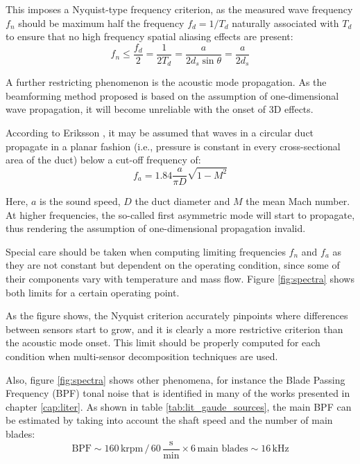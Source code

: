 This imposes a Nyquist-type frequency criterion, as the measured wave frequency $f_n$ should be maximum half the frequency $f_d=1/T_d$ naturally associated with $T_d$ to ensure that no high frequency spatial aliasing effects are present:
\begin{equation}\label{eq:f_nyquist}
  f_n \leq \frac{f_d}{2} = \frac{1}{2T_d}=\frac{a}{2d_s \sin \theta}=\frac{a}{2d_s}
\end{equation}

A further restricting phenomenon is the acoustic mode propagation. As the beamforming method proposed is based on the assumption of one-dimensional wave propagation, it will become unreliable with the onset of 3D effects.

According to Eriksson \cite{eriksson1980higher}, it may be assumed that waves in a circular duct propagate in a planar fashion (i.e., pressure is constant in every cross-sectional area of the duct) below a cut-off frequency of:
\begin{equation}\label{eq:f_modes}
f_a = 1.84 \frac{a}{\pi D}\sqrt{1-M^2}
\end{equation}

Here, $a$ is the sound speed, $D$ the duct diameter and $M$ the mean Mach number. At higher frequencies, the so-called first asymmetric mode will start to propagate, thus rendering the assumption of one-dimensional propagation invalid.

Special care should be taken when computing limiting frequencies $f_n$ and $f_a$ as they are not constant but dependent on the operating condition, since some of their components vary with temperature and mass flow. Figure \ref{fig:spectra} shows both limits for a certain operating point.

As the figure shows, the Nyquist criterion accurately pinpoints where differences between sensors start to grow, and it is clearly a more restrictive criterion than the acoustic mode onset. This limit should be properly computed for each condition when multi-sensor decomposition techniques are used.

Also, figure \ref{fig:spectra} shows other phenomena, for instance the Blade Passing Frequency (BPF) tonal noise that is identified in many of the works presented in chapter \ref{cap:liter}. As shown in table \ref{tab:lit_gaude_sources}, the main BPF can be estimated by taking into account the shaft speed and the number of main blades:
\begin{equation}
  \text{BPF} \sim 160\,\text{krpm}\,/\,60\,\frac{\text{s}}{\text{min}} \times 6\,\text{main blades} \sim 16\,\text{kHz}
\end{equation}

